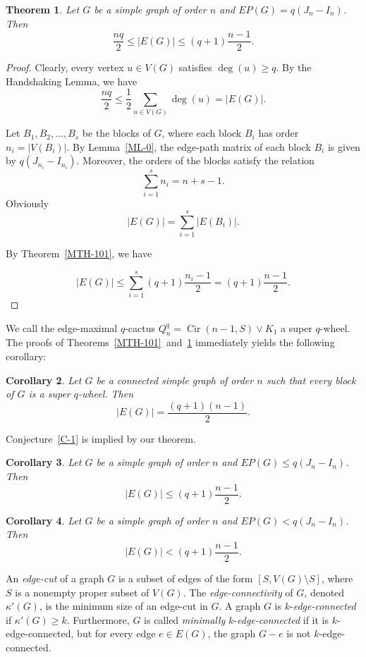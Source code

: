 \documentclass{article}
\newtheorem{theorem}{Theorem}[section]
\newtheorem{corollary}[theorem]{Corollary}
\begin{document}
\begin{theorem}\label{MTH-1011}
Let $G$ be a simple graph of order $n$ and $EP(G) = q(J_n-I_n)$. Then $$\frac{nq}{2}\leq |E(G)|\leq (q+1)\frac{n-1}{2}.$$
\end{theorem}
\begin{proof}
Clearly, every vertex \( u \in V(G) \) satisfies \(\deg(u) \geq q\). By the Handshaking Lemma, we have  
\[
\frac{nq}{2} \leq \frac{1}{2} \sum_{u \in V(G)} \deg(u) = |E(G)|.
\]  


Let \( B_1, B_2, \dots, B_s \) be the blocks of \( G \), where each block \( B_i \) has order \( n_i = |V(B_i)| \). By Lemma~\ref{ML-0}, the edge-path matrix of each block \( B_i \) is given by  
\(q(J_{n_i} - I_{n_i})\). Moreover, the orders of the blocks satisfy the relation  
\[
\sum_{i=1}^s n_i = n  + s- 1.
\] 
Obviously 
\[
|E(G)|=\sum_{i=1}^s |E(B_i)|.
\] 

By Theorem~\ref{MTH-101}, we have

\[
|E(G)|\le \sum_{i=1}^s(q+1)\frac{n_i-1}{2}=(q+1)\frac{n-1}{2}.
\] 

\end{proof}

\vskip 0.2cm
We call the edge-maximal $q$-cactus \(Q_n^{q}=\operatorname{Cir}(n-1,S)\vee K_1\) a super $q$-wheel. The proofs of Theorems~\ref{MTH-101}~and~\ref{MTH-1011} immediately yields the following corollary:

\begin{corollary}\label{MC-11}
Let \( G \) be a connected simple graph of order \( n \) such that every block of \( G \) is a super \( q \)-wheel. Then
\[
|E(G)| = \frac{(q+1)(n-1)}{2}.
\]
\end{corollary}

Conjecture~\ref{C-1} is implied by our theorem. 

\begin{corollary}
Let $G$ be a simple graph of order $n$ and $EP(G) \leq q(J_n-I_n)$. Then $$ |E(G)|\leq (q+1)\frac{n-1}{2}.
$$
\end{corollary}

\begin{corollary}
Let $G$ be a simple graph of order $n$ and $EP(G) < q(J_n-I_n)$. Then $$ |E(G)|< (q+1)\frac{n-1}{2}. 
$$
\end{corollary}

An {\it edge-cut} of a graph \( G \) is a subset of edges of the form \( [S, V(G) \setminus S] \), where \( S \) is a nonempty proper subset of \( V(G) \). The {\it edge-connectivity} of \( G \), denoted \( \kappa'(G) \), is the minimum size of an edge-cut in \( G \). A graph \( G \) is \( k \)-{\it edge-connected} if \( \kappa'(G) \geq k \). Furthermore, \( G \) is called {\it minimally} \( k \)-{\it edge-connected} if it is \( k \)-edge-connected, but for every edge \( e \in E(G) \), the graph \( G - e \) is not \( k \)-edge-connected.
\end{document}
